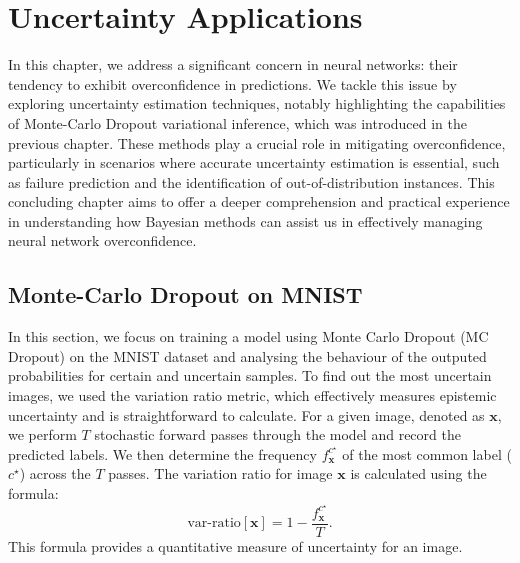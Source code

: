 \graphicspath{{figs/3c}}

\chapter{Uncertainty Applications}
In this chapter, we address a significant concern in neural networks: their tendency to exhibit overconfidence in predictions. We tackle this issue by exploring uncertainty estimation techniques, notably highlighting the capabilities of Monte-Carlo Dropout variational inference, which was introduced in the previous chapter. These methods play a crucial role in mitigating overconfidence, particularly in scenarios where accurate uncertainty estimation is essential, such as failure prediction and the identification of out-of-distribution instances. This concluding chapter aims to offer a deeper comprehension and practical experience in understanding how Bayesian methods can assist us in effectively managing neural network overconfidence.

\section{Monte-Carlo Dropout on MNIST}
In this section, we focus on training a model using Monte Carlo Dropout (MC Dropout) on the MNIST dataset and analysing the behaviour of the outputed probabilities for certain and uncertain samples. To find out the most uncertain images, we used the variation ratio metric, which effectively measures epistemic uncertainty and is straightforward to calculate. For a given image, denoted as $ \mathbf{x} $, we perform $ T $ stochastic forward passes through the model and record the predicted labels. We then determine the frequency $ f^{c^\star }_\mathbf{x} $ of the most common label ($ c^\star $) across the $ T $ passes. The variation ratio for image $ \mathbf{x} $ is calculated using the formula:
\[
    \text{var-ratio}[\mathbf{x}] = 1 - \frac{f^{c^\star }_\mathbf{x}}{T}
.\]
This formula provides a quantitative measure of uncertainty for an image.

